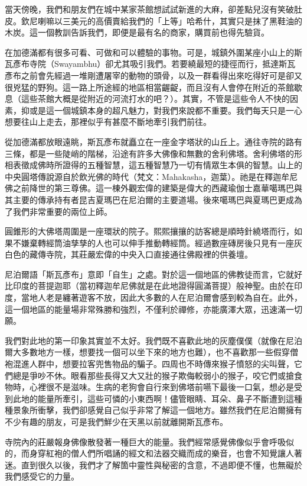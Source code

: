 當天傍晚，我們和朋友們在城中某家茶館想試試新進的大麻，卻差點兒沒有笑破肚皮。欽尼喇嘛以三美元的高價賣給我們的「上等」哈希什，其實只是抹了黑鞋油的木炭。這一個教訓告訴我們，即便是最有名的商家，購買前也得先驗貨。

在加德滿都有很多可看、可做和可以體驗的事物。可是，城鎮外圍某座小山上的斯瓦彥布寺院（Swayambhu）卻尤其吸引我們。若要繞最短的捷徑而行，抵達斯瓦彥布之前會先經過一堆剛遭屠宰的動物的頭骨，以及一群看得出來吃得好可是卻又很兇猛的野狗。這一路上所途經的地區相當齷齪，而且沒有人會停在附近的茶館歇息（這些茶館大概是從附近的河流打水的吧？）。其實，不管是這些令人不快的因素，抑或是這一個城鎮本身的超凡魅力，對我們來說都不重要。我們每天只是一心想要往山上走去，那裡似乎有甚麼不斷地牽引我們前往。

從加德滿都放眼遠眺，斯瓦彥布就矗立在一座金字塔狀的山丘上。通往寺院的路有三條，都是一些陡峭的階梯，沿途有許多大佛像和無數的舍利佛塔。舍利佛塔的形相表徵成佛時所證得的五種智慧，這五種智慧乃一切有情眾生本俱的智慧。山上的中央圓塔傳說源自於飲光佛的時代（梵文：Mahakasha，迦葉）。祂是在釋迦牟尼佛之前降世的第三尊佛。這一棟外觀宏偉的建築是偉大的西藏瑜伽士嘉華噶瑪巴與其主要的傳承持有者昆吉夏瑪巴在尼泊爾的主要道場。後來噶瑪巴與夏瑪巴更成為了我們非常重要的兩位上師。

圓錐形的大佛塔周圍是一座環狀的院子。熙熙攘攘的訪客總是順時針繞塔而行，如果不嫌棄轉經筒油孳孳的人也可以伸手推動轉經筒。經過數座磚房後只見有一座灰白色的藏傳寺院，其莊嚴宏偉的中央入口直接通往佛殿裡的供養壇。

尼泊爾語「斯瓦彥布」意即「自生」之處。對於這一個地區的佛教徒而言，它就好比印度的菩提迦耶（當初釋迦牟尼佛就是在此地證得圓滿菩提）般神聖。由於在印度，當地人老是纏著遊客不放，因此大多數的人在尼泊爾會感到較為自在。此外，這一個地區的能量場非常殊勝和強烈，不僅利於禪修，亦能廣澤大眾，迅速滿一切願。

我們對此地的第一印象其實並不太好。我們既不喜歡此地的灰塵僕僕（就像在尼泊爾大多數地方一樣，想要找一個可以坐下來的地方也難），也不喜歡那一些假穿僧袍混進人群中，想要拉客兜售物品的騙子。四周也不時傳來猴子憤怒的尖叫聲，它們總是爭吵不休。眼看那些長得又大又壯的猴子欺侮較弱小的猴子，咬它們或搶食物時，心裡很不是滋味。生病的老狗會自行來到佛塔前嚥下最後一口氣，想必是受到此地的能量所牽引，這些可憐的小東西啊！儘管眼睛、耳朵、鼻子不斷遭到這種種景象所衝擊，我們卻感覺自己似乎非常了解這一個地方。雖然我們在尼泊爾擁有不少有趣的朋友，可是我們鮮少在天黑以前就離開斯瓦彥布。

寺院內的莊嚴報身佛像散發著一種巨大的能量。我們經常感覺佛像似乎會呼吸似的，而身穿紅袍的僧人們所唱誦的經文和法器交織而成的樂音，也會不知覺讓人著迷。直到很久以後，我們才了解箇中靈性與秘密的含意，不過即便不懂，也無礙於我們感受它的力量。

